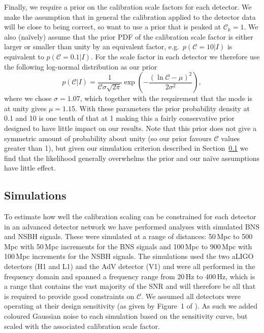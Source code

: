 \documentclass[prd, twocolumn, lengthcheck, superscriptaddress, showpacs, letterpaper, nofootinbib]{revtex4-1}
\newcommand{\scf}{\ensuremath{\mathcal{C}}}
\begin{document}
Finally, we require a prior on the calibration scale factors for each detector.
We make the assumption that in general the calibration applied to the detector
data will be close to being correct, so want to use a prior that is peaked at $\scf_k=1$. We
also (na\"{i}vely) assume that the prior \ac{PDF} of the calibration scale factor is either
larger or smaller than unity by an equivalent factor, e.g.\ $p(\scf=10|I)$ is
equivalent to $p(\scf=0.1|I)$. For the scale factor in each detector we 
therefore use the following log-normal distribution as our prior
%
\begin{equation}\label{eq:scale_prior}
 p(\scf|I) = \frac{1}{\scf\sigma\sqrt{2\pi}}\exp{\left( -\frac{(\ln{\scf} - \mu)^2}{2\sigma^2} 
\right)},
\end{equation}
%
where we chose $\sigma = 1.07$, which together with the requirement that the
mode is at unity gives $\mu = 1.15$. With these parameters the prior
probability density at 0.1 and 10 is one tenth of that at 1 making this a fairly
conservative prior designed to have little impact on our results. Note that this
prior does not give a symmetric amount of probability about unity (so our prior
favours \scf\xspace values greater than 1), but given our simulation criterion
described in Section~\ref{sec:simulations} we find that the likelihood
generally overwhelms the prior and our na\"{i}ve assumptions have little effect.

\subsection{Simulations}\label{sec:simulations}

To estimate how well the calibration scaling can be constrained for each
detector in an advanced detector network we have performed analyses with simulated
\ac{BNS} and \ac{NSBH} signals. These were simulated
at a range of distances: 50\,Mpc to 500\,Mpc with 50\,Mpc increments for the
\ac{BNS} signals and 100\,Mpc to 900\,Mpc with 100\,Mpc increments for the
\ac{NSBH} signals. The simulations used the two \ac{aLIGO} detectors (H1 and
L1) and the \ac{AdV} detector (V1) and were all performed in the frequency
domain and spanned a frequency range from 20\,Hz to 400\,Hz, which is a range that contains the 
vast majority of the \ac{SNR} and will therefore be all that is required to provide good 
constraints on \scf. We assumed all
detectors were operating at their design sensitivity (as given by Figure~1 of
\cite{2013arXiv1304.0670L}). As such we added coloured Gaussian noise to each
simulation based on the sensitivity curve, but scaled with the associated
calibration scale factor.
\end{document}
